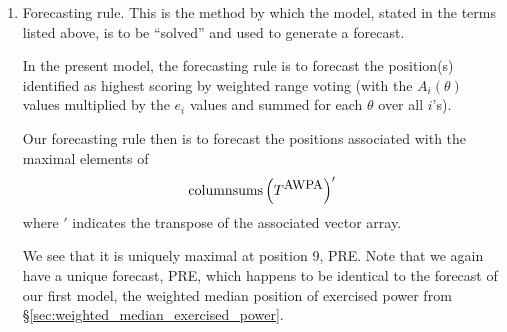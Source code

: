 \begin{enumerate}
%
%
%
%


\item Forecasting rule. This is the method by which the  model, stated in the terms listed above, is to be ``solved'' and used to generate a forecast. %

In the present model, the forecasting rule is to forecast the   {position}(s) identified as highest scoring by weighted  range voting (with the $A_i(\theta)$ values multiplied by the $e_i$ values and summed for each $\theta$ over all $i$'s).

Our forecasting rule then is to forecast the positions associated with the maximal elements of 
\begin{equation}
\mbox{columnsums}\left( T^{\mbox{\small AWPA}}\right)'
\end{equation}
where $'$ indicates the transpose of the associated vector array.

We see that it is uniquely maximal at   {position} 9, PRE.  Note that we again have a unique forecast, PRE, which happens to be identical to the forecast of our first model,  the weighted median   {position} of   {exercised power} from \S\ref{sec:weighted_median_exercised_power}. 

  \renewcommand{\theenumi}{\arabic{enumi}}
\end{enumerate}

